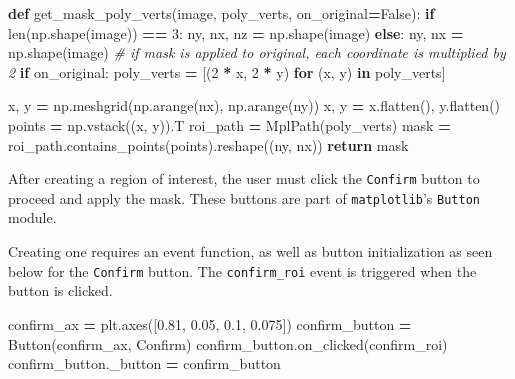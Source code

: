 \documentclass[
]{article}
\newenvironment{Shaded}{\begin{snugshade}}{\end{snugshade}}
\newcommand{\BuiltInTok}[1]{#1}
\newcommand{\CommentTok}[1]{\textcolor[rgb]{0.56,0.35,0.01}{\textit{#1}}}
\newcommand{\ControlFlowTok}[1]{\textcolor[rgb]{0.13,0.29,0.53}{\textbf{#1}}}
\newcommand{\DecValTok}[1]{\textcolor[rgb]{0.00,0.00,0.81}{#1}}
\newcommand{\FloatTok}[1]{\textcolor[rgb]{0.00,0.00,0.81}{#1}}
\newcommand{\KeywordTok}[1]{\textcolor[rgb]{0.13,0.29,0.53}{\textbf{#1}}}
\newcommand{\NormalTok}[1]{#1}
\newcommand{\OperatorTok}[1]{\textcolor[rgb]{0.81,0.36,0.00}{\textbf{#1}}}
\newcommand{\StringTok}[1]{\textcolor[rgb]{0.31,0.60,0.02}{#1}}
\newcommand{\VariableTok}[1]{\textcolor[rgb]{0.00,0.00,0.00}{#1}}
\begin{document}
\begin{Shaded}
\begin{Highlighting}[]
\KeywordTok{def}\NormalTok{ get\_mask\_poly\_verts(image, poly\_verts, on\_original}\OperatorTok{=}\VariableTok{False}\NormalTok{):}
    \ControlFlowTok{if} \BuiltInTok{len}\NormalTok{(np.shape(image)) }\OperatorTok{==} \DecValTok{3}\NormalTok{:}
\NormalTok{        ny, nx, nz }\OperatorTok{=}\NormalTok{ np.shape(image)}
    \ControlFlowTok{else}\NormalTok{:}
\NormalTok{        ny, nx }\OperatorTok{=}\NormalTok{ np.shape(image)}
    \CommentTok{\# if mask is applied to original, each coordinate is multiplied by 2}
    \ControlFlowTok{if}\NormalTok{ on\_original:}
\NormalTok{        poly\_verts }\OperatorTok{=}\NormalTok{ [(}\DecValTok{2} \OperatorTok{*}\NormalTok{ x, }\DecValTok{2} \OperatorTok{*}\NormalTok{ y) }\ControlFlowTok{for}\NormalTok{ (x, y) }\KeywordTok{in}\NormalTok{ poly\_verts]}

\NormalTok{    x, y }\OperatorTok{=}\NormalTok{ np.meshgrid(np.arange(nx), np.arange(ny))}
\NormalTok{    x, y }\OperatorTok{=}\NormalTok{ x.flatten(), y.flatten()}
\NormalTok{    points }\OperatorTok{=}\NormalTok{ np.vstack((x, y)).T}
\NormalTok{    roi\_path }\OperatorTok{=}\NormalTok{ MplPath(poly\_verts)}
\NormalTok{    mask }\OperatorTok{=}\NormalTok{ roi\_path.contains\_points(points).reshape((ny, nx))}
    \ControlFlowTok{return}\NormalTok{ mask}
\end{Highlighting}
\end{Shaded}

After creating a region of interest, the user must click the \texttt{Confirm} button to proceed and apply the mask. These buttons are part of \texttt{matplotlib}'s \texttt{Button} module.

Creating one requires an event function, as well as button initialization as seen below for the \texttt{Confirm} button. The \texttt{confirm\_roi} event is triggered when the button is clicked.

\begin{Shaded}
\begin{Highlighting}[]
\NormalTok{confirm\_ax }\OperatorTok{=}\NormalTok{ plt.axes([}\FloatTok{0.81}\NormalTok{, }\FloatTok{0.05}\NormalTok{, }\FloatTok{0.1}\NormalTok{, }\FloatTok{0.075}\NormalTok{])}
\NormalTok{confirm\_button }\OperatorTok{=}\NormalTok{ Button(confirm\_ax, }\StringTok{\textquotesingle{}Confirm\textquotesingle{}}\NormalTok{)}
\NormalTok{confirm\_button.on\_clicked(confirm\_roi)}
\NormalTok{confirm\_button.\_button }\OperatorTok{=}\NormalTok{ confirm\_button}
\end{Highlighting}
\end{Shaded}
\end{document}
